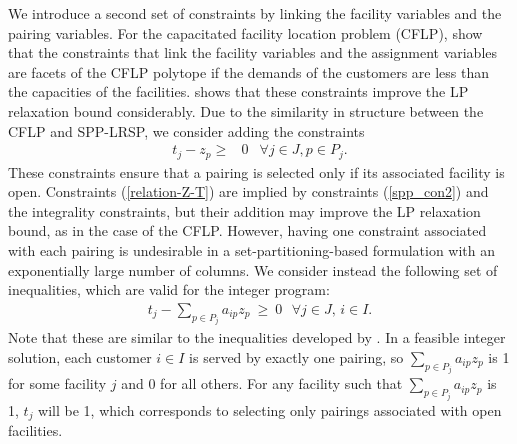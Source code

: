 \documentclass[11pt]{article}
\begin{document}
We introduce a second set of constraints by linking the facility variables and the pairing
variables.  For the capacitated facility location problem (CFLP), 
\cite{Leung} show that the constraints that link the facility variables and 
the assignment variables are facets 
of the CFLP polytope if the demands of the customers are less than the capacities of the facilities.  
\citet{Daskin} shows that these constraints improve the LP relaxation bound considerably.  
Due to the similarity in structure between
the CFLP and SPP-LRSP, we consider adding the constraints
\begin{eqnarray}
t_{j} - z_{p} \geq & 0  & \forall j \in J, p \in P_{j}. \label{relation-Z-T}
\end{eqnarray}
These constraints ensure that a pairing is selected only if its associated facility is open.  
Constraints (\ref{relation-Z-T})
are implied by constraints (\ref{spp_con2}) and the integrality constraints, but their addition 
may improve the LP relaxation bound, as in the case
of the CFLP.  However, having one constraint associated with each pairing is 
undesirable in a set-partitioning-based formulation with an exponentially large
number of columns.   
We consider instead the following set of inequalities, which are valid for the integer program:
\begin{eqnarray}
    t_j - \sum_{p \in P_{j}}a_{ip}z_{p}\ \geq \ 0 \mbox{\ \ $\forall j \in J$, $i \in I$.} \label{relation}
\end{eqnarray}
Note that these are similar to the inequalities developed by \cite{Berger07}.
In a feasible integer solution, each customer $i \in I$ is served by exactly one pairing, so $\sum_{p \in P_j}
a_{ip} z_{p}$ is 1 for some facility $j$ and 0 for all others.  For any facility such that $\sum_{p \in P_j}
a_{ip} z_{p}$ is 1, $t_j$ will be 1, which corresponds to selecting only pairings associated with open facilities.


\end{document}
